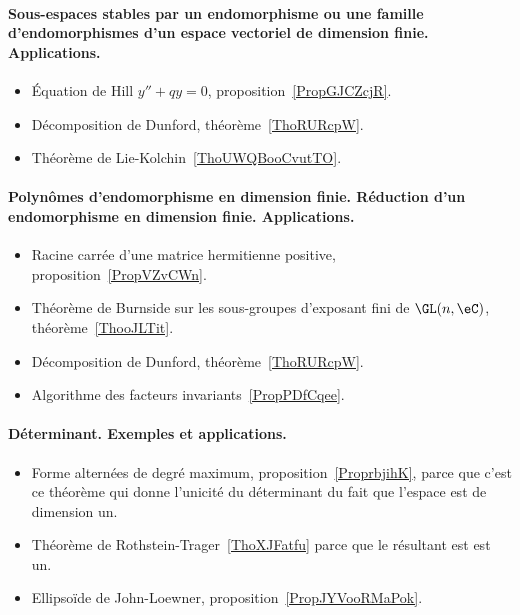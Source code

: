\paragraph{Sous-espaces stables par un endomorphisme ou une famille d'endomorphismes d’un espace vectoriel de dimension finie. Applications.}
\begin{itemize}
    \item Équation de Hill \( y''+qy=0\), proposition~\ref{PropGJCZcjR}.
    \item Décomposition de Dunford, théorème~\ref{ThoRURcpW}.
    \item Théorème de Lie-Kolchin~\ref{ThoUWQBooCvutTO}.
\end{itemize}
\paragraph{Polynômes d'endomorphisme en dimension finie. Réduction d’un endomorphisme en dimension finie. Applications.}
\begin{itemize}
    \item Racine carrée d'une matrice hermitienne positive, proposition~\ref{PropVZvCWn}.
    \item Théorème de Burnside sur les sous-groupes d'exposant fini de \( \GL(n,\eC)\), théorème~\ref{ThooJLTit}.
    \item Décomposition de Dunford, théorème~\ref{ThoRURcpW}.
    \item Algorithme des facteurs invariants~\ref{PropPDfCqee}.
\end{itemize}
\paragraph{Déterminant. Exemples et applications.}
\begin{itemize}
    \item Forme alternées de degré maximum, proposition~\ref{ProprbjihK}, parce que c'est ce théorème qui donne l'unicité du déterminant du fait que l'espace est de dimension un.
    \item Théorème de Rothstein-Trager~\ref{ThoXJFatfu} parce que le résultant est est un.
    \item Ellipsoïde de John-Loewner, proposition~\ref{PropJYVooRMaPok}.
\end{itemize}

